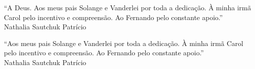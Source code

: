 
  \begin{flushright}

  \vspace*{\fill}
    
    “A Deus. Aos meus pais Solange e Vanderlei por toda a dedicação. À minha irmã Carol pelo incentivo e compreensão. Ao Fernando pelo constante apoio.” \\ Nathalia Sautchuk Patrício

  \vspace*{\fill}
    
    “Aos meus pais Solange e Vanderlei por toda a dedicação. À minha irmã Carol pelo incentivo e compreensão. Ao Fernando pelo constante apoio.” \\ Nathalia Sautchuk Patrício

  \vspace*{\fill}

  \end{flushright}
